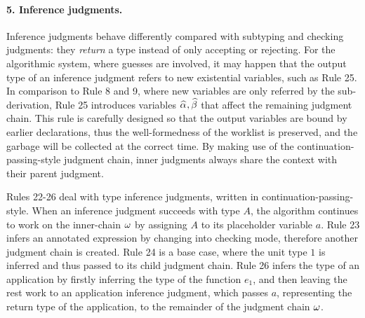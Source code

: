 \paragraph{\bf 5. Inference judgments.}
Inference judgments behave differently compared with subtyping and checking judgments:
they \emph{return} a type instead of only accepting or rejecting.
For the algorithmic system, where guesses are involved,
it may happen that the output type of an inference judgment refers to new existential variables,
such as Rule 25.
In comparison to Rule 8 and 9, where new variables are only referred by the sub-derivation,
Rule 25 introduces variables $\al, \bt$ that affect the remaining judgment chain.
This rule is carefully designed so that the output variables are bound by earlier declarations,
thus the well-formedness of the worklist is preserved,
and the garbage will be collected at the correct time.
By making use of the continuation-passing-style judgment chain,
inner judgments always share the context with their parent judgment.

\begin{comment}
Old text:
The design of our judgment chain is closely related to the shape of
the judgments
\jimmy{requires further clarification}
\bruno{What property? Not very clear}.
Subtyping and checking do not return anything, so variables cannot
leak anyway, as applied to Rules 8 and 9.
\bruno{Is the discussion that follows in the right place? We just jump
  to
  rule 26. Perhaps we can wait until we talk about inference to
  discuss those issues?}
However, inference and application inference may return a type that contains new variables.
Take Rule 26 as an example, if it simply returns $\al \to \bt$,
passes that to the next judgment and continues the type-checking process,
variables $\al$ and $\bt$ in the next judgment are out of scope
and will break the well-formedness of the worklist.
\end{comment}

Rules 22-26 deal with type inference judgments, written in continuation-passing-style.
When an inference judgment succeeds with type $A$,
the algorithm continues to work on the inner-chain $\omega$ by
assigning $A$ to its placeholder variable $a$.
Rule 23 infers an annotated expression by changing into checking mode,
therefore another judgment chain is created.
Rule 24 is a base case,
where the unit type $1$ is inferred and thus passed to its child judgment chain.
Rule 26 infers the type of an application by
firstly inferring the type of the function $e_1$,
and then leaving the rest work to an application inference judgment,
which passes $a$, representing the return type of the application,
to the remainder of the judgment chain $\omega$.

